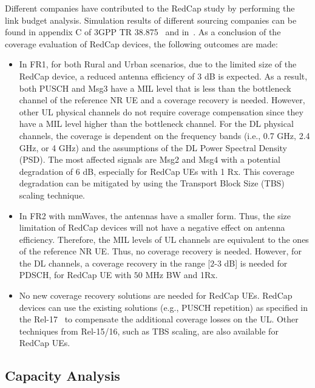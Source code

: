 \documentclass[]{IEEEtran}
\begin{document}
Different companies have contributed to the RedCap study by performing the link budget analysis. Simulation results of different sourcing companies can be found in appendix C of 3GPP TR 38.875~\cite{3gpp_study_2021_38.875} and in~\cite{3gpp_fl_2022_R1-2009293}. As a conclusion of the coverage evaluation of RedCap devices, the following outcomes are made:
\begin{itemize}
    \item In FR1, for both Rural and Urban scenarios, due to the limited size of the RedCap device, a reduced antenna efficiency of $3$ dB is expected. 
    As a result, both PUSCH and Msg3 have a MIL level that is less than the bottleneck channel of the reference NR UE and a coverage recovery is needed. 
    However, other UL physical channels do not require coverage compensation since they have a MIL level higher than the bottleneck channel. 
    For the DL physical channels, the coverage is dependent on the frequency bands (i.e., 0.7 GHz, 2.4 GHz, or 4 GHz) and the assumptions of the DL Power Spectral Density (PSD). The most affected signals are Msg2 and Msg4 with a potential degradation of $6$ dB, especially for RedCap UEs with 1 Rx. This coverage degradation can be mitigated by using the Transport Block Size (TBS) scaling technique.
    \item In FR2 with mmWaves, the antennas have a smaller form. Thus, the size limitation of RedCap devices will not have a negative effect on antenna efficiency.
    Therefore, the MIL levels of UL channels are equivalent to the ones of the reference NR UE. Thus, no coverage recovery is needed. 
    However, for the DL channels, a coverage recovery in the range [$2$-$3$ dB] is needed for PDSCH, for RedCap UE with $50$ MHz BW and 1Rx.
    \item No new coverage recovery solutions are needed for RedCap UEs.
    RedCap devices can use the existing solutions (e.g., PUSCH repetition) as specified in the Rel-17~\cite{3gpp_study_nodate-3_38.830} to compensate the additional coverage losses on the UL.
    Other techniques from Rel-15/16, such as TBS scaling, are also available for RedCap UEs.
\end{itemize}


\subsection{Capacity Analysis}
\label{sec:6-2}
\end{document}
